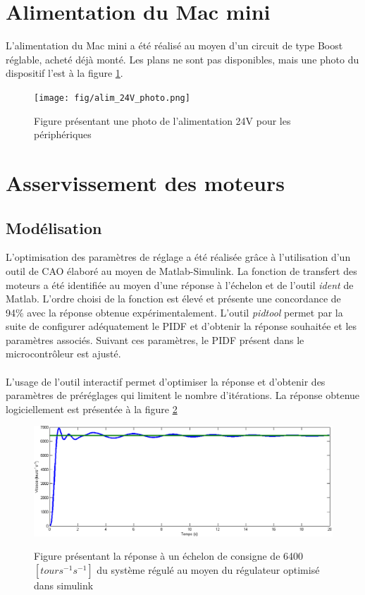 \section{Alimentation du Mac mini}
L'alimentation du Mac mini a été réalisé au moyen d'un circuit de type Boost réglable, acheté déjà monté. Les plans ne sont pas disponibles, mais une photo du dispositif l'est à la figure \ref{fig:alim24Vphoto}.

\begin{figure}[htbp]
\centering
\texttt{[image: fig/alim\_24V\_photo.png]}
\label{fig:alim24Vphoto}
\caption{Figure présentant une photo de l'alimentation 24V pour les périphériques}
\end{figure}

\section{Asservissement des moteurs}
\subsection{Modélisation}
L'optimisation des paramètres de réglage a été réalisée grâce à l'utilisation d'un outil de CAO élaboré au moyen de Matlab-Simulink. La fonction de transfert des moteurs a été identifiée au moyen d'une réponse à l'échelon et de l'outil \textit{ident} de Matlab. L'ordre choisi de la fonction est élevé et présente une concordance de 94\% avec la réponse obtenue expérimentalement. L'outil \textit{pidtool} permet par la suite de configurer adéquatement le PIDF et d'obtenir la réponse souhaitée et les paramètres associés. Suivant ces paramètres, le PIDF présent dans le microcontrôleur est ajusté.
\paragraph{}L'usage de l'outil interactif permet d'optimiser la réponse et d'obtenir des paramètres de préréglages qui limitent le nombre d'itérations. La réponse obtenue logiciellement est présentée à la figure \ref{fig:as_1}
\begin{figure}[htbp]
\centering
\includegraphics[scale=0.6]{fig/asservissement_1.png}
\label{fig:as_1}
\caption{Figure présentant la réponse à un échelon de consigne de 6400$\left[tours^{-1}s^{-1}\right]$ du système régulé au moyen du régulateur optimisé dans simulink}
\end{figure}
